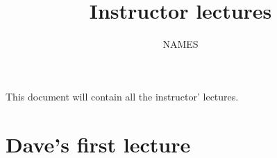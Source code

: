 \documentclass[11pt,reqno,oneside,a4paper]{article}
\title{Instructor lectures}
\author{NAMES}
\begin{document}

\maketitle
\thispagestyle{fancy}

This document will contain all the instructor' lectures.

\tableofcontents

\clearpage
\section{Dave's first lecture} \label{sec:lecture01}


% 
\end{document}
